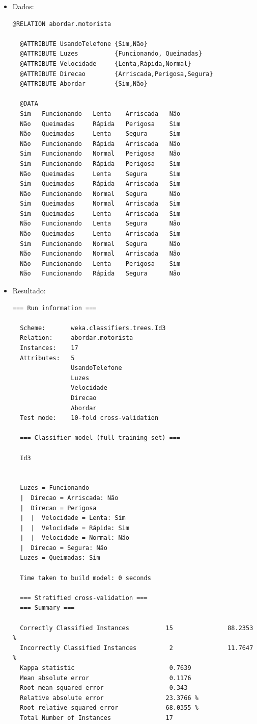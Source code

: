 \documentclass[
    article,            %
    11pt,               %
    oneside,            %
    a4paper,            %
    english,            %
    brazil,             %
    sumario=tradicional,
    ]{abntex2}
\begin{document}
\begin{itemize}
  \item Dados:
  \begin{Verbatim}[frame=single, fontsize=\tiny]
  @RELATION abordar.motorista

  @ATTRIBUTE UsandoTelefone {Sim,Não}
  @ATTRIBUTE Luzes          {Funcionando, Queimadas}
  @ATTRIBUTE Velocidade     {Lenta,Rápida,Normal}
  @ATTRIBUTE Direcao        {Arriscada,Perigosa,Segura}
  @ATTRIBUTE Abordar        {Sim,Não}

  @DATA
  Sim   Funcionando   Lenta    Arriscada   Não
  Não   Queimadas     Rápida   Perigosa    Sim
  Não   Queimadas     Lenta    Segura      Sim
  Não   Funcionando   Rápida   Arriscada   Não
  Sim   Funcionando   Normal   Perigosa    Não
  Sim   Funcionando   Rápida   Perigosa    Sim
  Não   Queimadas     Lenta    Segura      Sim
  Sim   Queimadas     Rápida   Arriscada   Sim
  Não   Funcionando   Normal   Segura      Não
  Sim   Queimadas     Normal   Arriscada   Sim
  Sim   Queimadas     Lenta    Arriscada   Sim
  Não   Funcionando   Lenta    Segura      Não
  Não   Queimadas     Lenta    Arriscada   Sim
  Sim   Funcionando   Normal   Segura      Não
  Não   Funcionando   Normal   Arriscada   Não
  Não   Funcionando   Lenta    Perigosa    Sim
  Não   Funcionando   Rápida   Segura      Não
  \end{Verbatim}  
  
  \item Resultado:  
  \begin{Verbatim}[frame=single, fontsize=\tiny]
  === Run information ===

  Scheme:       weka.classifiers.trees.Id3 
  Relation:     abordar.motorista
  Instances:    17
  Attributes:   5
                UsandoTelefone
                Luzes
                Velocidade
                Direcao
                Abordar
  Test mode:    10-fold cross-validation

  === Classifier model (full training set) ===

  Id3


  Luzes = Funcionando
  |  Direcao = Arriscada: Não
  |  Direcao = Perigosa
  |  |  Velocidade = Lenta: Sim
  |  |  Velocidade = Rápida: Sim
  |  |  Velocidade = Normal: Não
  |  Direcao = Segura: Não
  Luzes = Queimadas: Sim

  Time taken to build model: 0 seconds

  === Stratified cross-validation ===
  === Summary ===

  Correctly Classified Instances          15               88.2353 %
  Incorrectly Classified Instances         2               11.7647 %
  Kappa statistic                          0.7639
  Mean absolute error                      0.1176
  Root mean squared error                  0.343 
  Relative absolute error                 23.3766 %
  Root relative squared error             68.0355 %
  Total Number of Instances               17     


\end{Verbatim}
\end{itemize}
\end{document}
